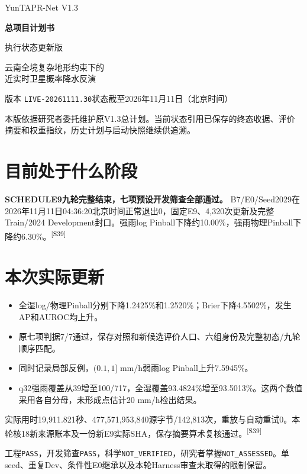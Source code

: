 \documentclass[UTF8,10.5pt,a4paper,fontset=none]{ctexart}
\newcommand{\evi}[1]{\textsuperscript{\color{muted}[#1]}}
\newcommand{\status}[1]{\textbf{\textcolor{ink}{#1}}}
\begin{document}
\thispagestyle{empty}
\vspace*{13mm}
{\Large\color{ink}YunTAPR-Net V1.3\par}
\vspace{6mm}
{\huge\bfseries 总项目计划书\par}
\vspace{3mm}
{\Large 执行状态更新版\par}
\vspace{7mm}
{\large 云南全境复杂地形约束下的\\近实时卫星概率降水反演\par}
\vspace{10mm}
版本 \texttt{LIVE-20261111.30}\qquad 状态截至2026年11月11日（北京时间）

本版依据研究者委托维护原V1.3总计划。当前状态引用已保存的终态收据、评价摘要和权重指纹，历史计划与启动快照继续供追溯。

\section*{目前处于什么阶段}
\status{SCHEDULE9九轮完整结束，七项预设开发筛查全部通过。}
B7/E0/Seed2029在2026年11月11日04:36:20北京时间正常退出0，固定E9、4,320次更新及完整Train/2024 Development封口。强雨log Pinball下降约10.00\%，强雨物理Pinball下降约6.30\%。\evi{S39}

\section*{本次实际更新}
\begin{itemize}
\item 全湿log/物理Pinball分别下降1.2425\%和1.2520\%；Brier下降4.5502\%，发生AP和AUROC均上升。
\item 原七项判据7/7通过，保存对照和新候选评价人口、六组身份及完整初态/九轮顺序匹配。
\item 同时记录局部反例，$(0.1,1]$ mm/h弱雨log Pinball上升7.5945\%。
\item q32强雨覆盖从39增至100/717，全湿覆盖93.4824\%增至93.5013\%。这两个数值采用各自分母，未形成点估计20 mm/h检出结果。
\end{itemize}
实际用时19,911.821秒、477,571,953,840源字节/142,813次，重放与自动重试0。本轮核18新来源账本及一份新E9实际SHA，保存摘要算术复核通过。\evi{S39}

工程\texttt{PASS}，开发筛查\texttt{PASS}，科学\texttt{NOT\_VERIFIED}，研究者掌握\texttt{NOT\_ASSESSED}。单seed、重复Dev、条件性E0继承以及本轮Harness审查未取得的限制保留。
\end{document}
